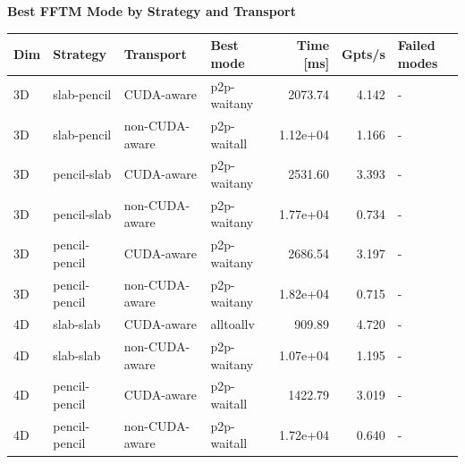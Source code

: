 \documentclass{article}
\begin{document}
\begin{center}
{\fontsize{8.0pt}{9.4pt}\selectfont
\textbf{Best FFTM Mode by Strategy and Transport}

\vspace{0.6em}
\begin{tabular}{llllrrl}
\hline
Dim & Strategy & Transport & Best mode & Time [ms] & Gpts/s & Failed modes \\
\hline
3D & slab-pencil & CUDA-aware & p2p-waitany & 2073.74 & 4.142 & - \\
3D & slab-pencil & non-CUDA-aware & p2p-waitall & 1.12e+04 & 1.166 & - \\
3D & pencil-slab & CUDA-aware & p2p-waitany & 2531.60 & 3.393 & - \\
3D & pencil-slab & non-CUDA-aware & p2p-waitany & 1.77e+04 & 0.734 & - \\
3D & pencil-pencil & CUDA-aware & p2p-waitany & 2686.54 & 3.197 & - \\
3D & pencil-pencil & non-CUDA-aware & p2p-waitany & 1.82e+04 & 0.715 & - \\
4D & slab-slab & CUDA-aware & alltoallv & 909.89 & 4.720 & - \\
4D & slab-slab & non-CUDA-aware & p2p-waitany & 1.07e+04 & 1.195 & - \\
4D & pencil-pencil & CUDA-aware & p2p-waitall & 1422.79 & 3.019 & - \\
4D & pencil-pencil & non-CUDA-aware & p2p-waitall & 1.72e+04 & 0.640 & - \\
\hline
\end{tabular}
}
\end{center}
\end{document}

